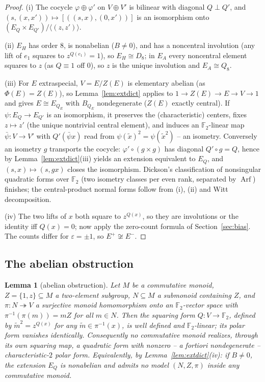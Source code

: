 \documentclass[11pt]{article}
\theoremstyle{plain}
\newtheorem{lemma}{Lemma}
\theoremstyle{definition}
\newcommand{\F}{\mathbb{F}}
\newcommand{\Arf}{\operatorname{Arf}}
\begin{document}
\begin{proof}
(i) The cocycle $\varphi\oplus\varphi'$ on $V\oplus V'$ is bilinear with
diagonal $Q\perp Q'$, and
$(s,(x,x'))\mapsto[((s,x),(0,x'))]$ is an isomorphism onto
$(E_Q\times E_{Q'})/\langle(z,z')\rangle$.

(ii) $E_H$ has order $8$, is nonabelian ($B\neq0$), and has a noncentral
involution (any lift of $e_1$ squares to $z^{Q(e_1)}=1$), so $E_H\cong D_8$;
in $E_A$ every noncentral element squares to $z$ (as $Q\equiv1$ off $0$), so
$z$ is the unique involution and $E_A\cong Q_8$.

(iii) For $E$ extraspecial, $V=E/Z(E)$ is elementary abelian (as
$\Phi(E)=Z(E)$), so Lemma~\ref{lem:extdict} applies to
$1\to Z(E)\to E\to V\to1$ and gives $E\cong E_{Q_E}$ with $B_{Q_E}$
nondegenerate ($Z(E)$ exactly central). If $\psi\colon E_Q\to E_{Q'}$ is an
isomorphism, it preserves the (characteristic) centers, fixes $z\mapsto z'$
(the unique nontrivial central element), and induces an $\F_2$-linear map
$\bar\psi\colon V\to V'$ with
$Q'(\bar\psi x)$ read from $\psi(\tilde x)^2=\psi(\tilde x^2)$ -- an
isometry. Conversely an isometry $g$ transports the cocycle:
$\varphi'\circ(g\times g)$ has diagonal $Q'\circ g=Q$, hence by
Lemma~\ref{lem:extdict}(iii) yields an extension equivalent to $E_Q$, and
$(s,x)\mapsto(s,gx)$ closes the isomorphism. Dickson's classification of
nonsingular quadratic forms over $\F_2$ (two isometry classes per even
rank, separated by $\Arf$) finishes; the central-product normal forms
follow from (i), (ii) and Witt decomposition.

(iv) The two lifts of $x$ both square to $z^{Q(x)}$, so they are
involutions or the identity iff $Q(x)=0$; now apply the zero-count formula
of Section~\ref{sec:bias}. The counts differ for $\varepsilon=\pm1$, so
$E^+\not\cong E^-$.
\end{proof}

\subsection{The abelian obstruction}

\begin{lemma}[abelian obstruction]\label{lem:abelian}
Let $M$ be a commutative monoid, $Z=\{1,z\}\subseteq M$ a two-element
subgroup, $N\subseteq M$ a submonoid containing $Z$, and
$\pi\colon N\twoheadrightarrow V$ a surjective monoid homomorphism onto an
$\F_2$-vector space with $\pi^{-1}(\pi(m))=mZ$ for all $m\in N$. Then the
squaring form $Q\colon V\to\F_2$, defined by $\tilde m^2=z^{Q(x)}$ for any
$\tilde m\in\pi^{-1}(x)$, is well defined and \emph{$\F_2$-linear}; its
polar form vanishes identically. Consequently no commutative monoid
realizes, through its own squaring map, a quadratic form with nonzero --
a fortiori nondegenerate -- characteristic-$2$ polar form. Equivalently, by
Lemma~\ref{lem:extdict}(iv): if $B\neq0$, the extension $E_Q$ is
nonabelian and admits no model $(N,Z,\pi)$ inside any commutative monoid.
\end{lemma}
\end{document}

